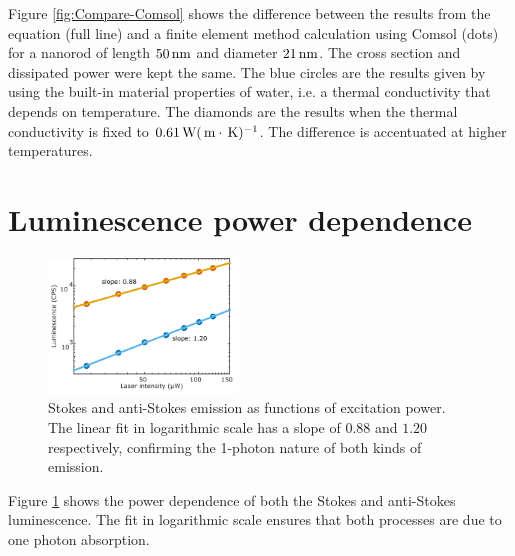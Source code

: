 Figure \ref{fig:Compare-Comsol} shows the difference between the results from
the equation (full line) and a finite element method calculation using Comsol
(dots) for a nanorod of length $50\,\textrm{nm}$ and diameter $21\,\textrm{nm}$. The cross section
and dissipated power were kept the same. The blue circles are the results given
by using the built-in material properties of water, i.e. a thermal conductivity
that depends on temperature. The diamonds are the results when the thermal
conductivity is fixed to $0.61 \,\textrm{W}(\,\textrm{m}\cdot\,\textrm{K})^{-1}$. The difference is
accentuated at higher temperatures.

\section{Luminescence power dependence}
\begin{figure}[htp] \centering
\includegraphics[width=0.45\textwidth]{Chapters/04_Anti-Stokes/Figures/Supplementary/01_AS_S_in_Log/01_AS_S_in_Log.png}
\caption{Stokes and anti-Stokes emission as functions of excitation power. The
linear fit in logarithmic scale has a slope of $0.88$ and $1.20$ respectively,
confirming the 1-photon nature of both kinds of emission.}
	\label{fig:Log_Plot}
\end{figure}

Figure \ref{fig:Log_Plot} shows the power dependence of both the Stokes and
anti-Stokes luminescence. The fit in logarithmic scale ensures that both
processes are due to one photon absorption. 

